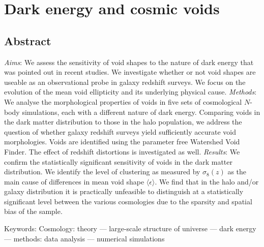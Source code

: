 


\chapter{Dark energy and cosmic voids}
\label{ch:voidsde}



\section*{Abstract}
{\small
\textit{Aims}: We assess the sensitivity of void shapes to the nature of dark
energy that was pointed out in recent studies. We investigate whether
or not void shapes are useable as an observational probe in galaxy redshift
surveys. We focus on the evolution of the mean void ellipticity and its
underlying physical cause.
\textit{Methods}: We analyse the morphological properties of voids in five sets
of cosmological $N$-body simulations, each with a different nature of dark energy.
Comparing voids in the dark matter distribution to those in the halo population,
we address the question of whether galaxy redshift surveys yield sufficiently accurate void morphologies. Voids are identified using the parameter free Watershed Void Finder.
The effect of redshift distortions is investigated as well.
\textit{Results}: We confirm the statistically significant sensitivity of voids
in the dark matter distribution.
We identify the level of clustering as measured by $\sigma_8(z)$ as the main
cause of differences in mean void shape $\langle\epsilon\rangle$. We find that
in the halo and/or galaxy distribution it is practically unfeasible to
distinguish at a statistically significant level between the various cosmologies
due to the sparsity and spatial bias of the sample.

Keywords: 
Cosmology: theory --- large-scale structure of universe --- dark energy
--- methods: data analysis --- numerical simulations
}

